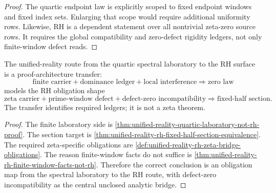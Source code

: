 \begin{proof}
The quartic endpoint law is explicitly scoped to fixed endpoint windows
and fixed index sets. Enlarging that scope would require additional
uniformity rows. Likewise, RH is a dependent statement over all
nontrivial zeta-zero source rows. It requires the global compatibility
and zero-defect rigidity ledgers, not only finite-window defect reads.
\end{proof}

\begin{theorem}
\label{thm:unified-reality-spectral-laboratory-to-rh-principle}
The unified-reality route from the quartic spectral laboratory to the RH
surface is a proof-architecture transfer:
$$
\text{finite carrier}
+
\text{dominance ledger}
+
\text{local interference}
\Rightarrow
\text{zero law}
$$
models the RH obligation shape
$$
\text{zeta carrier}
+
\text{prime-window defect}
+
\text{defect-zero incompatibility}
\Rightarrow
\text{fixed-half section}.
$$
The transfer identifies required ledgers; it is not a zeta theorem.
\end{theorem}

\begin{proof}
The finite laboratory side is
\autoref{thm:unified-reality-quartic-laboratory-not-rh-proof}. The
section target is
\autoref{thm:unified-reality-rh-fixed-half-section-equivalence}. The
required zeta-specific obligations are
\autoref{def:unified-reality-rh-zeta-bridge-obligations}. The reason
finite-window facts do not suffice is
\autoref{thm:unified-reality-rh-finite-window-facts-not-rh}. Therefore
the correct conclusion is an obligation map from the spectral laboratory
to the RH route, with defect-zero incompatibility as the central
unclosed analytic bridge.
\end{proof}
